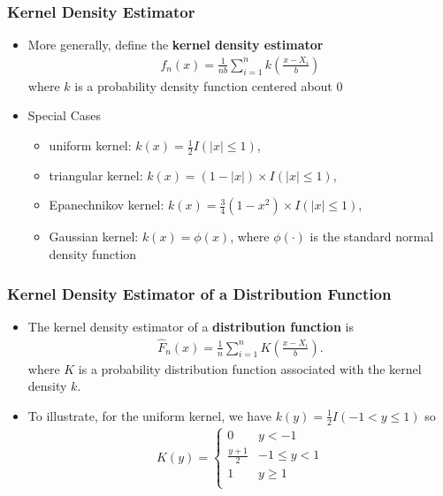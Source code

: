 \documentclass{beamer}
\begin{document}
\begin{frame}
\frametitle{Kernel Density Estimator}
\begin{itemize}
\item More generally, define the \textbf{kernel density estimator}
\begin{eqnarray*}
 f_n(x) = \frac{1}{nb} \sum_{i=1}^n k\left(\frac{x-X_i}{b}\right)
\end{eqnarray*}
where $k$ is a probability density function centered about 0


\item Special Cases
\begin{itemize}
\item uniform kernel: $k(x) = \frac{1}{2}I(|x| \le 1)$,

\item triangular kernel: $k(x) = (1-|x|)\times I(|x| \le 1)$,

\item Epanechnikov kernel: $k(x) = \frac{3}{4}(1-x^2) \times I(|x| \le 1)$, 

\item Gaussian kernel: $k(x) = \phi(x)$, where $\phi(\cdot)$ is the standard normal density function
\end{itemize}\end{itemize}
\end{frame}


\begin{frame}
\frametitle{Kernel Density Estimator of a Distribution Function}
\begin{itemize}
\item The kernel density estimator of a \textbf{distribution function} is
\begin{eqnarray*}
 \hat{F}_n(x) = \frac{1}{n} \sum_{i=1}^n K\left(\frac{x-X_i}{b}\right).
\end{eqnarray*}
where $K$ is a probability distribution function associated with the kernel density $k$.
\item To illustrate, for the uniform kernel, we have $k(y) = \frac{1}{2}I(-1 < y \le 1)$ so
\begin{eqnarray*}
K(y) =
\begin{cases}
0 &            y<-1\\
\frac{y+1}{2}& -1 \le y < 1 \\
1 & y \ge 1 \\
\end{cases}
\end{eqnarray*}
\end{itemize}
\end{frame}
\end{document}
